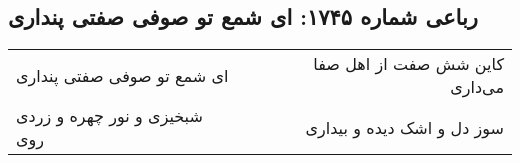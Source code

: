 \begin{center}
\section*{رباعی شماره ۱۷۴۵: ای شمع تو صوفی صفتی پنداری}
\label{sec:1745}
\begin{longtable}{l p{0.5cm} r}
ای شمع تو صوفی صفتی پنداری
&&
کاین شش صفت از اهل صفا می‌داری
\\
شبخیزی و نور چهره و زردی روی
&&
سوز دل و اشک دیده و بیداری
\\
\end{longtable}
\end{center}
